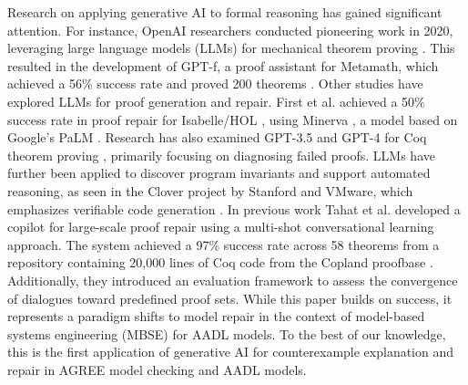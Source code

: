 Research on applying generative AI to formal reasoning has gained significant attention. For instance, OpenAI researchers conducted pioneering work in 2020, leveraging large language models (LLMs) for mechanical theorem proving \cite{polu2020generative}. This resulted in the development of GPT-f, a proof assistant for Metamath, which achieved a 56\% success rate and proved 200 theorems \cite{megill2019metamath}. Other studies have explored LLMs for proof generation and repair. First et al. achieved a 50\% success rate in proof repair for Isabelle/HOL \cite{first2023baldur}, using Minerva \cite{lewkowycz2022solving}, a model based on Google’s PaLM \cite{chowdhery2022palm}. Research has also examined GPT-3.5 and GPT-4 for Coq theorem proving \cite{zhang2023getting}, primarily focusing on diagnosing failed proofs. LLMs have further been applied to discover program invariants \cite{pei2023can, wu2023lemur} and support automated reasoning, as seen in the Clover project by Stanford and VMware, which emphasizes verifiable code generation \cite{sun2024clover}.
%
In previous work \cite{CoqDog} Tahat et al. developed a copilot for large-scale proof repair using a multi-shot conversational learning approach. The system achieved a 97\% success rate across 58 theorems from a repository containing 20,000 lines of Coq code from the Copland proofbase \cite{CoqDog}. Additionally, they introduced an evaluation framework to assess the convergence of dialogues toward predefined proof sets.
%
While this paper builds on \cite{CoqDog}
success, it represents a paradigm shifts to model repair in the context of model-based systems engineering (MBSE) for AADL models. %
To the best of our knowledge, this is the first application of generative AI for counterexample explanation and repair in AGREE model checking and AADL models.
